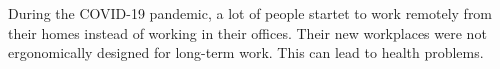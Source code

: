 During the COVID-19 pandemic, a lot of people startet to work remotely 
from their homes instead of working in their offices. Their new workplaces were not
ergonomically designed for long-term work. This can lead to health problems.

